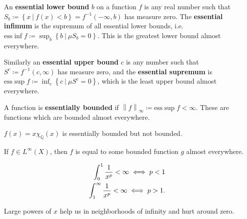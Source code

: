 \begin{definition}

An \textbf{essential lower bound} \(b\) on a function \(f\) is any real
number such that
\(S_{b} \coloneqq\left\{{x{~\mathrel{\Big|}~}f(x) < b }\right\} = f^{-1}(-\infty, b)\)
has measure zero. The \textbf{essential infimum} is the supremum of all
essential lower bounds,
i.e.~\({\mathrm{ess}}\inf f \coloneqq\sup_{b} \left\{{b{~\mathrel{\Big|}~}\mu S_b = 0}\right\}\).
This is the greatest lower bound almost everywhere.

Similarly an \textbf{essential upper bound} \(c\) is any number such
that \(S^c \coloneqq f^{-1}(c, \infty)\) has measure zero, and the
\textbf{essential supremum} is
\({\mathrm{ess}}\sup f \coloneqq\inf_{c} \left\{{c{~\mathrel{\Big|}~}\mu S^c = 0}\right\}\),
which is the least upper bound almost everywhere.

A function is \textbf{essentially bounded} if
\({\left\lVert {f} \right\rVert}_\infty \coloneqq{\mathrm{ess}}\sup f < \infty\).
These are functions which are bounded almost everywhere.

\end{definition}

\begin{example}

\(f(x) = x\chi_{\mathbb{Q}}(x)\) is essentially bounded but not bounded.

\end{example}

\begin{proposition}

If \(f\in L^\infty(X)\), then \(f\) is equal to some bounded function
\(g\) almost everywhere.

\end{proposition}

\begin{theorem}

\begin{align*}
\int_0^1 {1\over x^p} < \infty \iff  p < 1 \\
\int_1^\infty {1\over x^p} < \infty \iff  p > 1 
.\end{align*}

\end{theorem}

\begin{slogan}

Large powers of \(x\) help us in neighborhoods of infinity and hurt
around zero.

\end{slogan}

